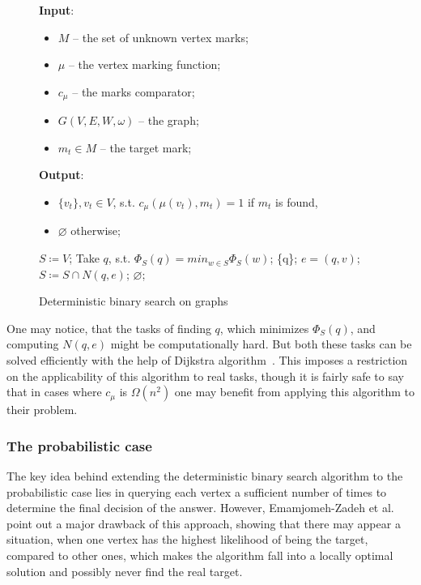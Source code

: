 \begin{figure}[H]
    \begin{framed}
        \begin{algorithmic}[1]
            \State \textbf{Input}:
            \begin{itemize}
            	\item $M$ -- the set of unknown vertex marks;
            	\item $\mu$ -- the vertex marking function;
            	\item $c_\mu$ -- the marks comparator;
            	\item $G(V, E, W, \omega)$ -- the graph;
            	\item $m_t \in M$ -- the target mark;
            \end{itemize}
            
            \State \textbf{Output}:
			\begin{itemize}
            	\item $\{v_t\}, v_t \in V$, s.t. $c_\mu(\mu(v_t), m_t) = 1$ if $m_t$ is found,
            	\item $\varnothing$ otherwise;
			\end{itemize}

			\State $S \coloneqq V$;
                \State Take $q$, s.t. $\Phi_S(q) = min_{w \in S} \Phi_S(w)$;
                    \State \Return \{q\};
                \Else
                    \State $e = (q, v)$;
                    \State $S \coloneqq S \cap N(q,e)$;
                \EndIf
            \EndWhile
            \State \Return $\varnothing$;
        \end{algorithmic}
    \end{framed}
    \caption{Deterministic binary search on graphs}
    \label{algDet}
\end{figure}


One may notice, that the tasks of finding $q$, which minimizes $\Phi_S(q)$, and computing $N(q, e)$ might be computationally hard. But both these tasks can be solved efficiently with the help of Dijkstra algorithm~\cite{dijkstra}. This imposes a restriction on the applicability of this algorithm to real tasks, though it is fairly safe to say that in cases where $c_\mu$ is $\Omega(n^2)$ one may benefit from applying this algorithm to their problem.


\clearpage
\subsubsection*{The probabilistic case}
The key idea behind extending the deterministic binary search algorithm to the probabilistic case lies in querying each vertex a sufficient number of times to determine the final decision of the answer. However, Emamjomeh-Zadeh et al. point out a major drawback of this approach, showing that there may appear a situation, when one vertex has the highest likelihood of being the target, compared to other ones, which makes the algorithm fall into a locally optimal solution and possibly never find the real target.


